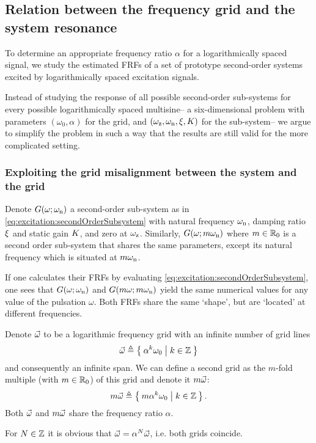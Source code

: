   \subsection{Relation between the frequency grid and the system resonance} 
  \label{sec:excitation:relationLogGridSystem}
  To determine an appropriate frequency ratio $\alpha$ for a logarithmically spaced signal, we study the estimated \glspl{FRF} of a set of prototype second-order systems excited by logarithmically spaced excitation signals.

  Instead of studying the response of all possible second-order sub-systems for every possible logarithmically spaced multisine-- a six-dimensional problem with parameters $(\omega_0, \alpha)$ for the grid, and $(\omega_{\mathrm{z}}, \omega_{\mathrm{n}}, \xi_{}, K_{})$ for the sub-system-- we argue to simplify the problem in such a way that the results are still valid for the more complicated setting.

  \subsubsection{Exploiting the grid misalignment between the system and the grid}
  Denote $G(\omega; \omega_{\mathrm{n}})$ a second-order sub-system as in \eqref{eq:excitation:secondOrderSubsystem} with natural frequency $\omega_{\mathrm{n}}$, damping ratio $\xi_{}$ and static gain $K_{}$, and zero at $\omega_{\mathrm{z}}$.
  Similarly, $G(\omega; m\omega_{\mathrm{n}})$ where $m \in {\ensuremath{\mathbb{R}}}_{0}$ is a second order sub-system that shares the same parameters, except its natural frequency which is situated at $m\omega_{\mathrm{n}}$.

  If one calculates their \glspl{FRF} by evaluating \eqref{eq:excitation:secondOrderSubsystem}, one sees that $G(\omega; \omega_{\mathrm{n}})$ and $G(m\omega; m\omega_{\mathrm{n}})$ yield the same numerical values for any value of the pulsation $\omega$.
  Both \glspl{FRF} share the same `shape', but are `located' at different frequencies.

  Denote $\vec{\omega}$ to be a logarithmic frequency grid with an infinite number of grid lines
  \begin{equation}
    \vec{\omega} \triangleq \Set{\alpha^k \omega_0 | k \in \ensuremath{\mathbb{Z}}}
    \label{eq:excitation:freqGridLog}
  \end{equation}
  and consequently an infinite span.
  We can define a second grid as the $m$-fold multiple (with $m \in {\ensuremath{\mathbb{R}}}_{0}$) of this grid and denote it $m\vec{\omega}$:
  \begin{equation}
    m \vec{\omega} \triangleq \Set{m \alpha^k \omega_0 | k \in \ensuremath{\mathbb{Z}}}
    \text{.}
  \end{equation}
  Both $\vec{\omega}$ and $m\vec{\omega}$ share the frequency ratio $\alpha$.
  \begin{remark} \label{rem:excitation:exc:gridscaling}
    For $N \in \mathbb{Z}$ it is obvious that $\vec{\omega} = \alpha^{N} \vec{\omega}$, i.e. both grids coincide.
  \end{remark}

